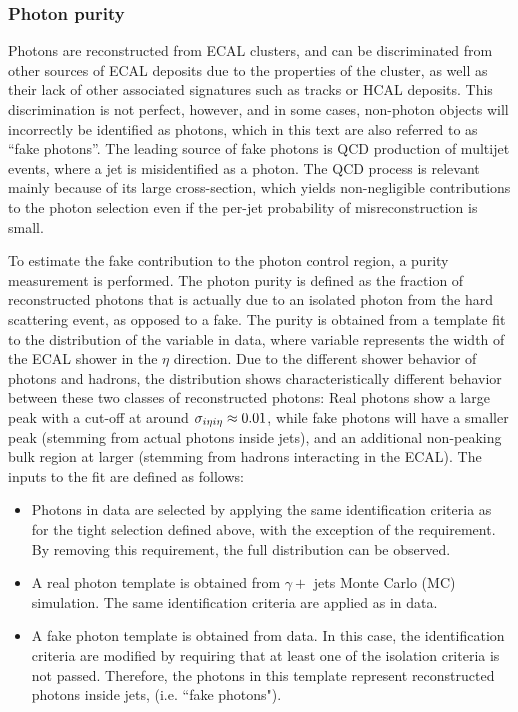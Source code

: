 \subsubsection{Photon purity}
\label{subsec:photonpurity}

Photons are reconstructed from ECAL clusters, and can be discriminated from other sources of ECAL deposits due 
to the properties of the cluster, as well as their lack of other associated signatures such as tracks or HCAL 
deposits. This discrimination is not perfect, however, and in some cases, non-photon objects will incorrectly be 
identified as photons, which in this text are also referred to as ``fake photons''.
The leading source of fake photons is QCD production of multijet events, where 
a jet is misidentified as a photon. The QCD process is relevant mainly because of its large cross-section, which yields non-negligible 
contributions to the photon selection even if the per-jet probability of misreconstruction is small.

To estimate the fake contribution to the photon control region, a purity measurement is performed. The photon purity is 
defined as the fraction of reconstructed photons that is actually due to an isolated photon from the hard scattering event, 
as opposed to a fake. The purity is obtained from a template fit to the distribution of the \sieie variable in data, where 
\sieie variable represents the width of the ECAL shower in the $\eta$ direction. Due to the different shower behavior of 
photons and hadrons, the \sieie distribution shows characteristically different behavior between these two classes of 
reconstructed photons: Real photons show a large peak with a cut-off at around $\sigma_{i\eta i\eta}\approx0.01$, while fake photons will 
have a smaller peak (stemming from actual photons inside jets), and an additional non-peaking bulk region at larger 
\sieie (stemming from hadrons interacting in the ECAL). The inputs to the fit are defined as follows:

\begin{itemize}
\item Photons in data are selected by applying the same identification criteria as for the tight selection defined above, 
with the exception of the \sieie requirement. By removing this requirement, the full \sieie distribution can be observed.

\item A real photon template is obtained from $\gamma +$ jets Monte Carlo (MC) simulation. The same identification criteria are applied as in data.

\item A fake photon template is obtained from data. In this case, the identification criteria are modified by requiring that 
at least one of the isolation criteria is not passed. Therefore, the photons in this template represent reconstructed photons inside jets,
(i.e. ``fake photons").

\end{itemize}

